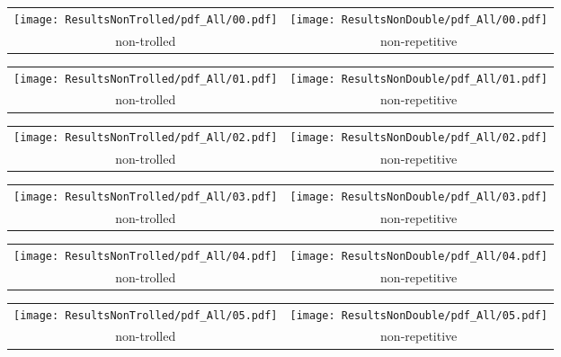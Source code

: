 \begin{tabular}{cc}
{  \texttt{[image: ResultsNonTrolled/pdf\_All/00.pdf]} } & 
{  \texttt{[image: ResultsNonDouble/pdf\_All/00.pdf]}} \\
 non-trolled & non-repetitive \\
\end{tabular}

\begin{tabular}{cc}
{  \texttt{[image: ResultsNonTrolled/pdf\_All/01.pdf]} } & 
{  \texttt{[image: ResultsNonDouble/pdf\_All/01.pdf]}} \\
 non-trolled & non-repetitive \\
\end{tabular}

\begin{tabular}{cc}
{  \texttt{[image: ResultsNonTrolled/pdf\_All/02.pdf]} } & 
{  \texttt{[image: ResultsNonDouble/pdf\_All/02.pdf]}} \\
 non-trolled & non-repetitive \\
\end{tabular}

\begin{tabular}{cc}
{  \texttt{[image: ResultsNonTrolled/pdf\_All/03.pdf]} } & 
{  \texttt{[image: ResultsNonDouble/pdf\_All/03.pdf]}} \\
 non-trolled & non-repetitive \\
\end{tabular}

\begin{tabular}{cc}
{  \texttt{[image: ResultsNonTrolled/pdf\_All/04.pdf]} } & 
{  \texttt{[image: ResultsNonDouble/pdf\_All/04.pdf]}} \\
 non-trolled & non-repetitive \\
\end{tabular}

\begin{tabular}{cc}
{  \texttt{[image: ResultsNonTrolled/pdf\_All/05.pdf]} } & 
{  \texttt{[image: ResultsNonDouble/pdf\_All/05.pdf]}} \\
 non-trolled & non-repetitive \\
\end{tabular}

